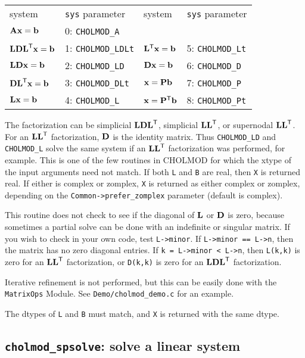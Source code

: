\documentclass[11pt]{article}
\newcommand{\m}[1]{{\bf{#1}}}       %
\newcommand{\tr}{^{\sf T}}          %
\begin{document}
\begin{tabular}{ll|ll}
\hline
system                  & {\tt sys} parameter    & system                & {\tt sys} parameter  \\
$\m{Ax}=\m{b}$          & 0: {\tt CHOLMOD\_A}    &                       &                      \\
$\m{LDL}\tr\m{x}=\m{b}$ & 1: {\tt CHOLMOD\_LDLt} & $\m{L}\tr\m{x}=\m{b}$ & 5: {\tt CHOLMOD\_Lt} \\
$\m{LDx}=\m{b}$         & 2: {\tt CHOLMOD\_LD}   & $\m{Dx}=\m{b}$        & 6: {\tt CHOLMOD\_D}  \\
$\m{DL}\tr\m{x}=\m{b}$  & 3: {\tt CHOLMOD\_DLt}  & $\m{x}=\m{Pb}$        & 7: {\tt CHOLMOD\_P}  \\
$\m{Lx}=\m{b}$          & 4: {\tt CHOLMOD\_L}    & $\m{x}=\m{P}\tr\m{b}$ & 8: {\tt CHOLMOD\_Pt} \\
\hline
\end{tabular}

The factorization can be simplicial $\m{LDL}\tr$, simplicial $\m{LL}\tr$, or
supernodal $\m{LL}\tr$.  For an $\m{LL}\tr$ factorization, $\m{D}$ is the
identity matrix.  Thus {\tt CHOLMOD\_LD} and {\tt CHOLMOD\_L} solve the same
system if an $\m{LL}\tr$ factorization was performed, for example.  This is one
of the few routines in CHOLMOD for which the xtype of the input arguments need
not match.  If both {\tt L} and {\tt B} are real, then {\tt X} is returned
real.  If either is complex or zomplex, {\tt X} is returned as either complex
or zomplex, depending on the {\tt Common->prefer\_zomplex} parameter (default
is complex).

This routine does not check to see if the diagonal of $\m{L}$ or $\m{D}$ is
zero, because sometimes a partial solve can be done with an indefinite or
singular matrix.  If you wish to check in your own code, test {\tt L->minor}.
If {\tt L->minor == L->n}, then the matrix has no zero diagonal entries.  If
{\tt k = L->minor < L->n}, then {\tt L(k,k)} is zero for an $\m{LL}\tr$
factorization, or {\tt D(k,k)} is zero for an $\m{LDL}\tr$ factorization.

Iterative refinement is not performed, but this can be easily done with
the {\tt MatrixOps} Module.  See {\tt Demo/cholmod\_demo.c} for an example.

The dtypes of \verb'L' and \verb'B' must match, and \verb'X' is returned
with the same dtype.

\subsection{{\tt cholmod\_spsolve}: solve a linear system}
\end{document}
